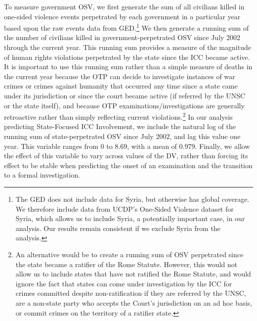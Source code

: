 To measure government OSV, we first generate the sum of all civilians killed in one-sided violence events perpetrated by each government in a particular year based upon the raw events data from GED.\footnote{The GED does not include data for Syria, but otherwise has global coverage. We therefore include data from UCDP's One-Sided Violence dataset \citep{eck2007one} for Syria, which allows us to include Syria, a potentially important case, in our analysis. Our results remain consistent if we exclude Syria from the analysis.} We then generate a running sum of the number of civilians killed in government-perpetrated OSV since July 2002 through the current year. This running sum provides a measure of the magnitude of human rights violations perpetrated by the state since the ICC became active. It is important to use this running sum rather than a simple measure of deaths in the current year because the OTP can decide to investigate instances of war crimes or crimes against humanity that occurred any time since a state came under its jurisdiction or since the court became active (if referred by the UNSC or the state itself), and because OTP examinations/investigations are generally retroactive rather than simply reflecting current violations.\footnote{An alternative would be to create a running sum of OSV perpetrated since the state became a ratifier of the Rome Statute. However, this would not allow us to include states that have not ratified the Rome Statute, and would ignore the fact that states can come under investigation by the ICC for crimes committed despite non-ratification if they are referred by the UNSC, are a non-state party who accepts the Court's jurisdiction on an ad hoc basis, or commit crimes on the territory of a ratifier state.} In our analysis predicting State-Focused ICC Involvement, we include the natural log of the running sum of state-perpetrated OSV since July 2002, and lag this value one year. This variable ranges from 0 to 8.69, with a mean of 0.979. Finally, we allow the effect of this variable to vary across values of the DV, rather than forcing its effect to be stable when predicting the onset of an examination and the transition to a formal investigation.

